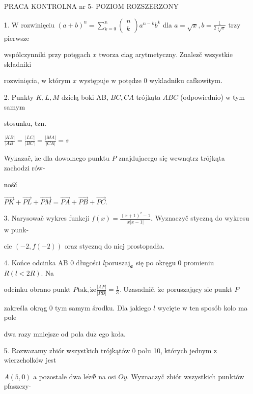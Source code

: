 \documentclass[a4paper,12pt]{article}
\begin{document}
PRACA KONTROLNA nr 5- POZIOM ROZSZERZONY

1. $\mathrm{W}$ rozwinięciu $(a+b)^{n} = \displaystyle \sum_{k=0}^{n}\left(\begin{array}{l}
n\\
k
\end{array}\right)a^{n-k}b^{k}$ dla $a = \sqrt{x}, b = \displaystyle \frac{1}{2\sqrt[4]{x}}$ trzy pierwsze

wspólczynniki przy potęgach $x$ tworza ciag arytmetyczny. Znalez$\acute{}$č wszystkie składniki

rozwinięcia, $\mathrm{w}$ którym $x$ występuje $\mathrm{w}$ potędze $0$ wykladniku cafkowitym.

2. Punkty $K, L, M$ dzielą boki AB, $BC, CA$ trójkąta $ABC$ (odpowiednio) $\mathrm{w}$ tym samym

stosunku, $\mathrm{t}\mathrm{z}\mathrm{n}.$

$\displaystyle \frac{|KB|}{|AB|}=\frac{|LC|}{|BC|}=\frac{|MA|}{|CA|}=s$

Wykazač, $\dot{\mathrm{z}}\mathrm{e}$ dla dowolnego punktu $P$ znajdujacego się wewnqtrz trójkąta zachodzi rów-

nośč

$\vec{PK}+\vec{PL}+\vec{PM}=\vec{PA}+\vec{PB}+\vec{PC}.$

3. Narysowač wykres funkcji $f(x)=\displaystyle \frac{(x+1)^{2}-1}{x|x-1|}$. Wyznaczyč styczną do wykresu $\mathrm{w}$ punk-

cie $(-2,f(-2))$ oraz stycznq do niej prostopadła.

4. Końce odcinka AB $0$ długości $l\mathrm{p}\mathrm{o}\mathrm{r}\mathrm{u}\mathrm{s}\mathrm{z}\mathrm{a}\mathrm{j}_{\Phi}$ się po okręgu $0$ promieniu $R (l<2R)$. Na

odcinku obrano punkt $P\mathrm{t}\mathrm{a}\mathrm{k}, \dot{\mathrm{z}}\mathrm{e} \displaystyle \frac{|AP|}{|PB|} = \displaystyle \frac{1}{3}$. Uzasadnič, $\dot{\mathrm{z}}\mathrm{e}$ poruszający $\mathrm{s}\mathrm{i}\mathrm{e}$ punkt $P$

zakreśla okrąg $0$ tym samym środku. Dla jakiego $l$ wycięte $\mathrm{w}$ ten sposób kolo ma pole

dwa razy mniejsze od pola $\mathrm{d}\mathrm{u}\dot{\mathrm{z}}$ ego koła.

5. Rozwazamy zbiór wszystkich trójkątów $0$ polu 10, których jednym $\mathrm{z}$ wierzcholków jest

$A(5,0)$ a pozostale dwa $\mathrm{l}\mathrm{e}\dot{\mathrm{z}}\Phi$ na osi $Oy$. Wyznaczyč zbiór wszystkich punktów pfaszczy-
\end{document}
